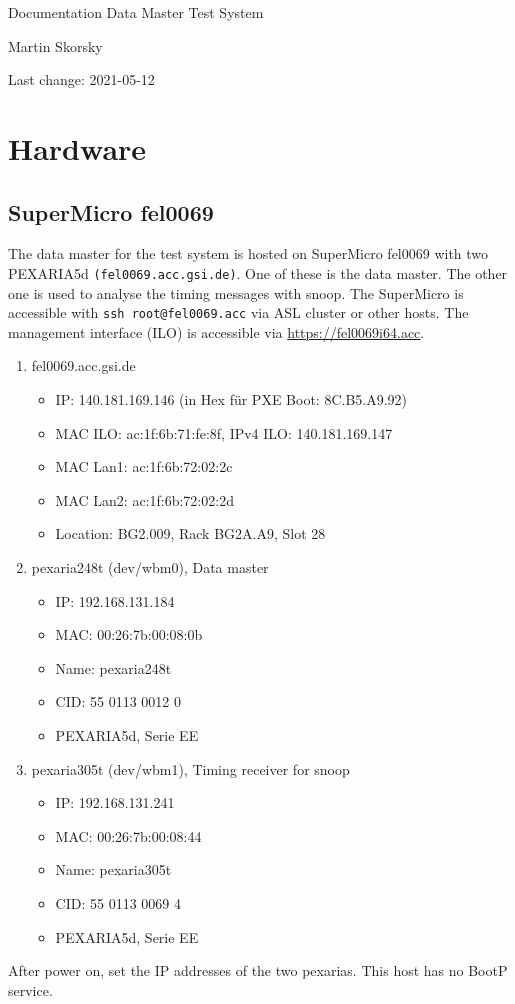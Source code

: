 \documentclass[12pt,a4paper]{report}
\begin{document}
\begin{titlepage}
\vspace{2cm}
\begin{center}
\Huge{Documentation Data Master Test System}

\Large{Martin Skorsky}

\Large{Last change: 2021-05-12}
\end{center}
\vfill
\end{titlepage}

\tableofcontents

\chapter{Hardware}
\section{SuperMicro fel0069}
The data master for the test system is hosted on SuperMicro fel0069 with two PEXARIA5d \texttt{(fel0069.acc.gsi.de)}.
One of these is the data master. The other one is used to analyse the timing messages with snoop.
The SuperMicro is accessible with \texttt{ssh root@fel0069.acc} via ASL cluster or other hosts.
The management interface (ILO) is accessible via \url{https://fel0069i64.acc}.
\begin{enumerate}
\item fel0069.acc.gsi.de
\begin{itemize}
\item IP: 140.181.169.146 (in Hex für PXE Boot: 8C.B5.A9.92)
\item MAC ILO: ac:1f:6b:71:fe:8f, IPv4 ILO: 140.181.169.147
\item MAC Lan1: ac:1f:6b:72:02:2c
\item MAC Lan2: ac:1f:6b:72:02:2d
\item Location: BG2.009, Rack BG2A.A9, Slot 28
\end{itemize}
\item pexaria248t (dev/wbm0), Data master
\begin{itemize}
\item IP: 192.168.131.184
\item MAC: 00:26:7b:00:08:0b
\item Name: pexaria248t
\item CID: 55 0113 0012 0
\item PEXARIA5d, Serie EE
\end{itemize}
\item pexaria305t (dev/wbm1), Timing receiver for snoop
\begin{itemize}
\item IP: 192.168.131.241
\item MAC: 00:26:7b:00:08:44
\item Name: pexaria305t
\item CID: 55 0113 0069 4
\item PEXARIA5d, Serie EE
\end{itemize}
\end{enumerate}
After power on, set the IP addresses of the two pexarias. This host has no BootP service.
\end{document}
